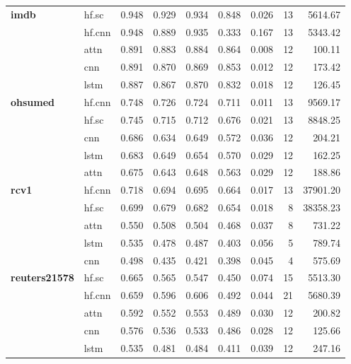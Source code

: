 \documentclass[final]{clv2025-revised}
\begin{document}
\begin{table}[h!]
\begin{tabular}{@{}p{2cm}p{1.2cm}rrrrrrr@{}}
\midrule
\textbf{imdb} & hf.sc & 0.948 & 0.929 & 0.934 & 0.848 & 0.026 & 13 & 5614.67 \\
 & hf.cnn & 0.948 & 0.889 & 0.935 & 0.333 & 0.167 & 13 & 5343.42 \\
 & attn & 0.891 & 0.883 & 0.884 & 0.864 & 0.008 & 12 & 100.11 \\
 & cnn & 0.891 & 0.870 & 0.869 & 0.853 & 0.012 & 12 & 173.42 \\
 & lstm & 0.887 & 0.867 & 0.870 & 0.832 & 0.018 & 12 & 126.45 \\
\midrule
\textbf{ohsumed} & hf.cnn & 0.748 & 0.726 & 0.724 & 0.711 & 0.011 & 13 & 9569.17 \\
 & hf.sc & 0.745 & 0.715 & 0.712 & 0.676 & 0.021 & 13 & 8848.25 \\
 & cnn & 0.686 & 0.634 & 0.649 & 0.572 & 0.036 & 12 & 204.21 \\
 & lstm & 0.683 & 0.649 & 0.654 & 0.570 & 0.029 & 12 & 162.25 \\
 & attn & 0.675 & 0.643 & 0.648 & 0.563 & 0.029 & 12 & 188.86 \\
\midrule
\textbf{rcv1} & hf.cnn & 0.718 & 0.694 & 0.695 & 0.664 & 0.017 & 13 & 37901.20 \\
 & hf.sc & 0.699 & 0.679 & 0.682 & 0.654 & 0.018 & 8 & 38358.23 \\
 & attn & 0.550 & 0.508 & 0.504 & 0.468 & 0.037 & 8 & 731.22 \\
 & lstm & 0.535 & 0.478 & 0.487 & 0.403 & 0.056 & 5 & 789.74 \\
 & cnn & 0.498 & 0.435 & 0.421 & 0.398 & 0.045 & 4 & 575.69 \\
\midrule
\textbf{reuters21578} & hf.sc & 0.665 & 0.565 & 0.547 & 0.450 & 0.074 & 15 & 5513.30 \\
 & hf.cnn & 0.659 & 0.596 & 0.606 & 0.492 & 0.044 & 21 & 5680.39 \\
 & attn & 0.592 & 0.552 & 0.553 & 0.489 & 0.030 & 12 & 200.82 \\
 & cnn & 0.576 & 0.536 & 0.533 & 0.486 & 0.028 & 12 & 125.66 \\
 & lstm & 0.535 & 0.481 & 0.484 & 0.411 & 0.039 & 12 & 247.16 \\
\bottomrule
\end{tabular}
\end{table}
\end{document}
